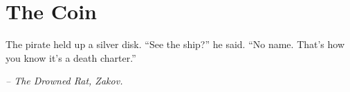 \chapter*{The Coin}

The pirate held up a silver disk. “See the ship?” he said. “No name. That’s how you know it’s a death charter.”

\smallskip

\noindent \textit{– The Drowned Rat, Zakov.}

